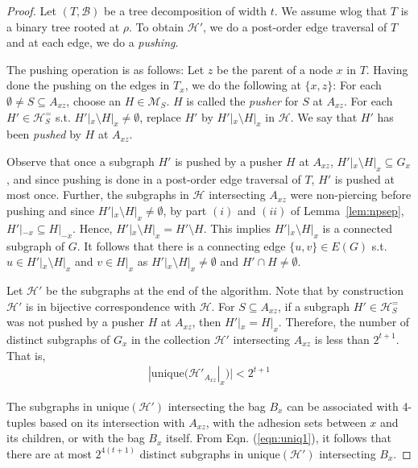 \documentclass[10pt,a4paper]{amsart}
\newcommand{\HH}{\mathcal{H}}
\newcommand{\unique}{\textrm{unique}}
\begin{document}
\begin{proof}
Let $(T,\mathcal{B})$ be a tree decomposition of width $t$. We assume wlog
that $T$ is a binary tree rooted at $\rho$.
To obtain $\mathcal{H}'$, we
do a post-order edge traversal of $T$ and at each
edge, we do a \emph{pushing}. 

The pushing operation is as follows:
Let $z$ be the parent of a node $x$ in $T$.
Having done the pushing on the edges in $T_x$, we do the
following at $\{x,z\}$: 
For each $\emptyset\neq S\subseteq A_{xz}$, choose an $H\in\mathcal{M}_S$.
$H$ is called the \emph{pusher} for $S$ at $A_{xz}$. 
For each $H'\in\mathcal{H}^=_S$ s.t. $H'|_x\setminus H|_x\neq\emptyset$,
replace $H'$ by $H'|_x\setminus H|_x$ in $\mathcal{H}$. 
We say that $H'$ has been \emph{pushed}
by $H$ at $A_{xz}$. 

Observe that once a subgraph $H'$ is pushed by a pusher $H$
at $A_{xz}$, $H'|_x\setminus H|_x\subseteq G_x$, and since pushing is
done in a post-order edge traversal of $T$, 
$H'$ is pushed at most once.
Further, the subgraphs in
$\HH$ intersecting $A_{xz}$ were non-piercing before pushing and
since $H'|_x\setminus H|_x\neq\emptyset$, by part $(i)$ and $(ii)$ of Lemma~\ref{lem:npsep},
$H'|_{-x}\subseteq H|_{-x}$. Hence,
$H'|_x\setminus H|_x=H'\setminus H$. This implies
$H'|_x\setminus H|_x$ is a connected subgraph of $G$.
It follows that there
is a connecting edge $\{u,v\}\in E(G)$ s.t.
$u\in H'|_x\setminus H|_x$ and $v\in H|_x$ as
$H'|_x\setminus H|_x\neq\emptyset$ and $H'\cap H\neq\emptyset$.

Let $\mathcal{H}'$ be the subgraphs at the end of the algorithm.
Note that by construction $\mathcal{H}'$ is in bijective correspondence
with $\mathcal{H}$.
For $S\subseteq A_{xz}$,
if a subgraph $H'\in\HH^{=}_S$ was not pushed by a pusher $H$ at $A_{xz}$, then
$H'|_x=H|_x$. 
Therefore, the number of distinct subgraphs of $G_x$ in the collection $\mathcal{H}'$ intersecting $A_{xz}$ is less than
$2^{t+1}$. That is, 
\begin{align}
\label{eqn:uniq1}
|\unique(\mathcal{H}'_{A_{xz}}|_x)|<2^{t+1}
\end{align}

The subgraphs in $\unique(\HH')$ intersecting the bag $B_x$ can be 
associated with 4-tuples based on its intersection with $A_{xz}$, with the
adhesion sets between $x$ and its children, or with the bag $B_x$ itself.
From Eqn. (\ref{eqn:uniq1}), it follows that there are at most $2^{4(t+1)}$ distinct subgraphs in $\unique(\HH')$ intersecting $B_x$.


\end{proof}
\end{document}
